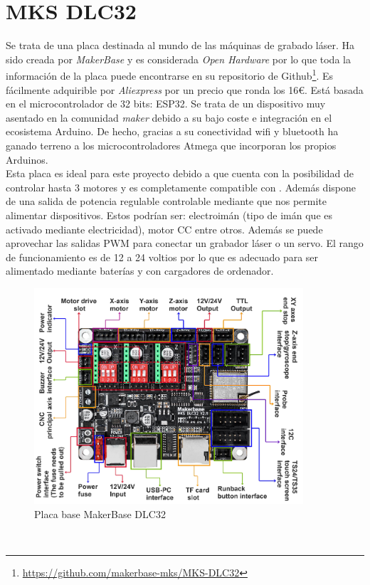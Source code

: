 \section{MKS DLC32}
\label{subsec:mksdlc32}
Se trata de una placa destinada al mundo de las máquinas de grabado láser. Ha sido creada por \textit{MakerBase} y es considerada 
\textit{Open Hardware} por lo que toda la información de la placa puede encontrarse en su repositorio de Github\footnote{\url{https://github.com/makerbase-mks/MKS-DLC32}}.
Es fácilmente adquirible por \textit{Aliexpress} por un precio que ronda los 16\euro. Está basada en el microcontrolador de 32 bits: ESP32. 
Se trata de un dispositivo muy asentado en la comunidad \textit{maker} debido a su bajo coste e integración en el 
ecosistema Arduino. De hecho, gracias a su conectividad wifi y bluetooth ha ganado terreno a los microcontroladores Atmega que incorporan los propios Arduinos.\\
Esta placa es ideal para este proyecto debido a que cuenta con la posibilidad de controlar 
hasta 3 motores y es completamente compatible con . Además dispone de una salida de potencia regulable controlable mediante  que nos 
permite alimentar dispositivos. Estos podrían ser: electroimán (tipo de imán que es activado mediante electricidad), motor \ac{CC} entre otros. Además se puede aprovechar las salidas \ac{PWM} para conectar un grabador láser o un servo. 
El rango de funcionamiento es de 12 a 24 voltios por lo que es adecuado para ser alimentado mediante baterías y con cargadores de ordenador. 
\begin{figure} [h!]
    \begin{center}
      \includegraphics[width=10cm]{figs/MKS.png}
    \end{center}
    \caption{Placa base MakerBase DLC32}
    \label{fig:robSoldering}
  \end{figure}\ 

